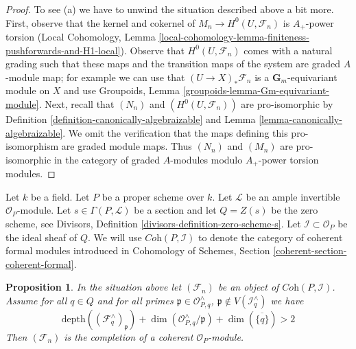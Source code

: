 \documentclass{stacks-project}
\theoremstyle{plain}
\newtheorem{proposition}[subsection]{Proposition}
\theoremstyle{definition}
\theoremstyle{remark}
\numberwithin{equation}{subsection}
\begin{document}
\begin{proof}
\medskip\noindent
To see (a) we have to unwind the situation described above a bit more.
First, observe that the kernel and cokernel of $M_n \to H^0(U, \mathcal{F}_n)$
is $A_+$-power torsion (Local Cohomology, Lemma
\ref{local-cohomology-lemma-finiteness-pushforwards-and-H1-local}).
Observe that $H^0(U, \mathcal{F}_n)$ comes with a natural grading
such that these maps and the transition maps of the system are
graded $A$-module map; for example we can use that
$(U \to X)_*\mathcal{F}_n$ is a $\mathbf{G}_m$-equivariant module
on $X$ and use 
Groupoids, Lemma \ref{groupoids-lemma-Gm-equivariant-module}.
Next, recall that $(N_n)$ and $(H^0(U, \mathcal{F}_n))$
are pro-isomorphic by Definition \ref{definition-canonically-algebraizable}
and Lemma \ref{lemma-canonically-algebraizable}.
We omit the verification that the maps defining this
pro-isomorphism are graded module maps.
Thus $(N_n)$ and $(M_n)$ are pro-isomorphic in the category of
graded $A$-modules modulo $A_+$-power torsion modules.
\end{proof}

\noindent
Let $k$ be a field. Let $P$ be a proper scheme over $k$.
Let $\mathcal{L}$ be an ample invertible $\mathcal{O}_P$-module.
Let $s \in \Gamma(P, \mathcal{L})$ be a section and let
$Q = Z(s)$ be the zero scheme, see
Divisors, Definition \ref{divisors-definition-zero-scheme-s}.
Let $\mathcal{I} \subset \mathcal{O}_P$ be the ideal sheaf of $Q$.
We will use $\textit{Coh}(P, \mathcal{I})$ to denote the category
of coherent formal modules introduced in
Cohomology of Schemes, Section \ref{coherent-section-coherent-formal}.

\begin{proposition}
\label{proposition-lefschetz-existence}
In the situation above let $(\mathcal{F}_n)$ be an object of
$\textit{Coh}(P, \mathcal{I})$. Assume for all $q \in Q$ and for
all primes $\mathfrak p \in \mathcal{O}_{P, q}^\wedge$,
$\mathfrak p \not \in V(\mathcal{I}_q^\wedge)$ we have
$$
\text{depth}((\mathcal{F}_q^\wedge)_\mathfrak p) +
\dim(\mathcal{O}_{P, q}^\wedge/\mathfrak p) +
\dim(\overline{\{q\}}) > 2
$$
Then $(\mathcal{F}_n)$ is the completion of a coherent
$\mathcal{O}_P$-module.
\end{proposition}
\end{document}

